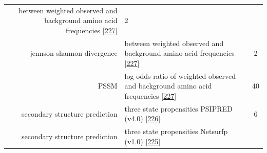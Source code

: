\documentclass[11pt,a4paper,twoside]{book}
\theoremstyle{definition}
\theoremstyle{definition}
\theoremstyle{remark}
\begin{document}
\begin{longtable}[]{@{}rlc@{}}
\begin{minipage}[t]{0.50\columnwidth}
between weighted observed and background amino acid frequencies
{[}\protect\hyperlink{ref-Robinson1991}{227}{]}\strut
\end{minipage} & \begin{minipage}[t]{0.18\columnwidth}\centering\strut
2\strut
\end{minipage}\tabularnewline
\begin{minipage}[t]{0.23\columnwidth}\raggedleft\strut
jennson shannon divergence\strut
\end{minipage} & \begin{minipage}[t]{0.50\columnwidth}\raggedright\strut
between weighted observed and background amino acid frequencies
{[}\protect\hyperlink{ref-Robinson1991}{227}{]}\strut
\end{minipage} & \begin{minipage}[t]{0.18\columnwidth}\centering\strut
2\strut
\end{minipage}\tabularnewline
\begin{minipage}[t]{0.23\columnwidth}\raggedleft\strut
PSSM\strut
\end{minipage} & \begin{minipage}[t]{0.50\columnwidth}\raggedright\strut
log odds ratio of weighted observed and background amino acid
frequencies {[}\protect\hyperlink{ref-Robinson1991}{227}{]}\strut
\end{minipage} & \begin{minipage}[t]{0.18\columnwidth}\centering\strut
40\strut
\end{minipage}\tabularnewline
\begin{minipage}[t]{0.23\columnwidth}\raggedleft\strut
secondary structure prediction\strut
\end{minipage} & \begin{minipage}[t]{0.50\columnwidth}\raggedright\strut
three state propensities PSIPRED (v4.0)
{[}\protect\hyperlink{ref-Jones1999}{226}{]}\strut
\end{minipage} & \begin{minipage}[t]{0.18\columnwidth}\centering\strut
6\strut
\end{minipage}\tabularnewline
\begin{minipage}[t]{0.23\columnwidth}\raggedleft\strut
secondary structure prediction\strut
\end{minipage} & \begin{minipage}[t]{0.50\columnwidth}\raggedright\strut
three state propensities Netsurfp (v1.0)
{[}\protect\hyperlink{ref-Petersen2009a}{225}{]}\strut
\end{minipage} & \begin{minipage}[t]{0.18\columnwidth}\centering\strut

\end{minipage}
\end{longtable}
\end{document}

